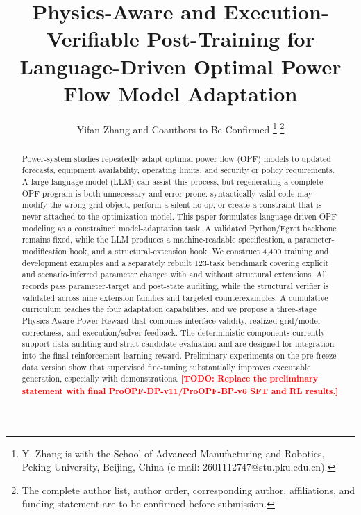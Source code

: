 \documentclass[lettersize,journal]{IEEEtran}
\newcommand{\drafttodo}[1]{\textcolor{red}{\textbf{[TODO: #1]}}}
\newcommand{\methodname}{Power-Reward}
\newcommand{\dataset}{ProOPF-DP-v11}
\newcommand{\benchmark}{ProOPF-BP-v6}
\begin{document}
\title{Physics-Aware and Execution-Verifiable Post-Training for Language-Driven Optimal Power Flow Model Adaptation}

\author{Yifan Zhang and Coauthors to Be Confirmed%
\thanks{Y. Zhang is with the School of Advanced Manufacturing and Robotics, Peking University, Beijing, China (e-mail: 2601112747@stu.pku.edu.cn).}%
\thanks{The complete author list, author order, corresponding author, affiliations, and funding statement are to be confirmed before submission.}}

\maketitle

\begin{abstract}
Power-system studies repeatedly adapt optimal power flow (OPF) models to updated forecasts, equipment availability, operating limits, and security or policy requirements. A large language model (LLM) can assist this process, but regenerating a complete OPF program is both unnecessary and error-prone: syntactically valid code may modify the wrong grid object, perform a silent no-op, or create a constraint that is never attached to the optimization model. This paper formulates language-driven OPF modeling as a constrained model-adaptation task. A validated Python/Egret backbone remains fixed, while the LLM produces a machine-readable specification, a parameter-modification hook, and a structural-extension hook. We construct 4,400 training and development examples and a separately rebuilt 123-task benchmark covering explicit and scenario-inferred parameter changes with and without structural extensions. All records pass parameter-target and post-state auditing, while the structural verifier is validated across nine extension families and targeted counterexamples. A cumulative curriculum teaches the four adaptation capabilities, and we propose a three-stage Physics-Aware \methodname{} that combines interface validity, realized grid/model correctness, and execution/solver feedback. The deterministic components currently support data auditing and strict candidate evaluation and are designed for integration into the final reinforcement-learning reward. Preliminary experiments on the pre-freeze data version show that supervised fine-tuning substantially improves executable generation, especially with demonstrations. \drafttodo{Replace the preliminary statement with final \dataset{}/\benchmark{} SFT and RL results.}
\end{abstract}
\end{document}
